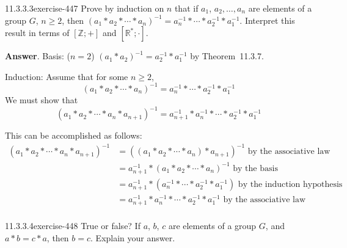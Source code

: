 \documentclass[twoside,10pt,]{book}
\numberwithin{equation}{section}
\begin{document}
\begin{divisionsolution}{11.3.3.3}{}{exercise-447}%
\hypertarget{p-3936}{}%
Prove by induction on \(n\) that if \(a_1\), \(a_2,\ldots , a_n\) are elements of a group \(G\), \(n\geq 2\), then \(\left(a_1*a_2*\cdots *a_n\right)^{-1}= a_n^{-1}*\cdots *a_2^{-1}*a_1^{-1}\). Interpret this result in terms of \([\mathbb{Z}; +]\) and \([\mathbb{R}^*;\cdot]\).%
\par\smallskip%
\noindent\textbf{Answer}.\quad%
\hypertarget{p-3937}{}%
Basis: (\(n = 2\))   \(\left(a_1*a_2\right)^{-1}= a_2^{-1}*a_1^{-1}\) by Theorem~11.3.7.%
\par
\hypertarget{p-3938}{}%
Induction: Assume that for some \(n \geq  2\),%
\begin{equation*}
\left(a_1*a_2* \cdots *a_n\right)^{-1}=a_n^{-1}* \cdots * a_2^{-1}*a_1^{-1}
\end{equation*}
We must show that%
\begin{equation*}
\left(a_1*a_2* \cdots *a_n*a_{n+1}\right)^{-1}=a_{n+1}^{-1}*a_n^{-1}* \cdots * a_2^{-1}*a_1^{-1}
\end{equation*}
%
\par
\hypertarget{p-3939}{}%
This can be accomplished as follows:%
\begin{equation*}
\begin{split}
\left(a_1*a_2*\cdots *a_n*a_{n+1}\right)^{-1} &=\left(\left(a_1*a_2*\cdots *a_n\right)*a_{n+1}\right)^{-1}\textrm{  
by the associative law}\\
&=a_{n+1}^{-1}*\left(a_1*a_2*\cdots *a_n\right)^{-1}\textrm{      by the basis}\\
&=a_{n+1}^{-1}*\left(a_n^{-1}*\cdots * a_2^{-1}*a_1^{-1}\right) \textrm{   by the induction hypothesis}\\
&= a_{n+1}^{-1}*a_n^{-1}*\cdots * a_2^{-1}*a_1^{-1} \textrm{   by the associative law}\\
\end{split}
\end{equation*}
%
\end{divisionsolution}%
\begin{divisionsolution}{11.3.3.4}{}{exercise-448}%
\hypertarget{p-3940}{}%
True or false? If \(a\), \(b\), \(c\) are elements of a group \(G\), and \(a * b = c * a\), then \(b = c\). Explain your answer.%
\end{divisionsolution}%
\end{document}
